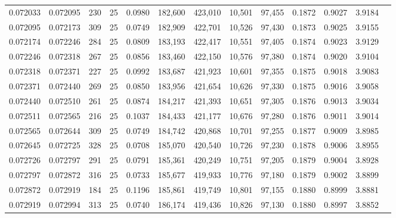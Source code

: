 \begin{tabular}{rrrrrrrrrrrrr}
0.072033 & 0.072095 &   230 &  25 &                                     0.0980 & 182,600 & 423,010 &  10,501 &  97,455 & 0.1872 & 0.9027 & 3.9184 \\
0.072095 & 0.072173 &   309 &  25 &                                     0.0749 & 182,909 & 422,701 &  10,526 &  97,430 & 0.1873 & 0.9025 & 3.9155 \\
0.072174 & 0.072246 &   284 &  25 &                                     0.0809 & 183,193 & 422,417 &  10,551 &  97,405 & 0.1874 & 0.9023 & 3.9129 \\
0.072246 & 0.072318 &   267 &  25 &                                     0.0856 & 183,460 & 422,150 &  10,576 &  97,380 & 0.1874 & 0.9020 & 3.9104 \\
0.072318 & 0.072371 &   227 &  25 &                                     0.0992 & 183,687 & 421,923 &  10,601 &  97,355 & 0.1875 & 0.9018 & 3.9083 \\
0.072371 & 0.072440 &   269 &  25 &                                     0.0850 & 183,956 & 421,654 &  10,626 &  97,330 & 0.1875 & 0.9016 & 3.9058 \\
0.072440 & 0.072510 &   261 &  25 &                                     0.0874 & 184,217 & 421,393 &  10,651 &  97,305 & 0.1876 & 0.9013 & 3.9034 \\
0.072511 & 0.072565 &   216 &  25 &                                     0.1037 & 184,433 & 421,177 &  10,676 &  97,280 & 0.1876 & 0.9011 & 3.9014 \\
0.072565 & 0.072644 &   309 &  25 &                                     0.0749 & 184,742 & 420,868 &  10,701 &  97,255 & 0.1877 & 0.9009 & 3.8985 \\
0.072645 & 0.072725 &   328 &  25 &                                     0.0708 & 185,070 & 420,540 &  10,726 &  97,230 & 0.1878 & 0.9006 & 3.8955 \\
0.072726 & 0.072797 &   291 &  25 &                                     0.0791 & 185,361 & 420,249 &  10,751 &  97,205 & 0.1879 & 0.9004 & 3.8928 \\
0.072797 & 0.072872 &   316 &  25 &                                     0.0733 & 185,677 & 419,933 &  10,776 &  97,180 & 0.1879 & 0.9002 & 3.8899 \\
0.072872 & 0.072919 &   184 &  25 &                                     0.1196 & 185,861 & 419,749 &  10,801 &  97,155 & 0.1880 & 0.8999 & 3.8881 \\
0.072919 & 0.072994 &   313 &  25 &                                     0.0740 & 186,174 & 419,436 &  10,826 &  97,130 & 0.1880 & 0.8997 & 3.8852 \\

\end{tabular}
